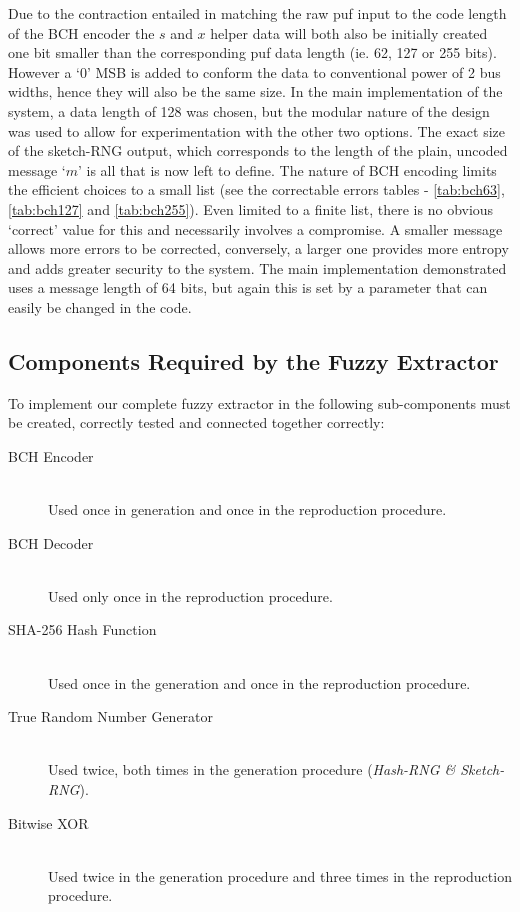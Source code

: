 Due to the contraction entailed in matching the raw \gls{puf} input to the
code length of the BCH encoder
the $s$ and $x$ helper data will both also be initially created one bit smaller
than the corresponding \gls{puf} data length (ie. 62, 127 or 255 bits).
However a `0' MSB
is added to conform the data to conventional power of 2 bus widths, hence
they will also be the same size. In the main implementation of the system, a data
length of 128 was chosen, but the modular nature of the design was used to
allow for experimentation with the other two options.
The exact size of the sketch-RNG output, which corresponds to the length of the
plain, uncoded message `$m$' is all that is now left to define. The nature
of BCH encoding limits the efficient choices to a small list (see the
correctable errors tables - \autoref{tab:bch63},
\autoref{tab:bch127} and \autoref{tab:bch255}).
Even limited to a finite list, there is no
obvious `correct' value for this and necessarily involves a compromise.
A smaller
message allows more errors to be corrected, conversely, a larger one provides more entropy and
adds greater security to the system. The main implementation demonstrated uses
a message length of 64 bits, but again this is set by a parameter that can easily be
changed in the code.

\subsection{Components Required by the Fuzzy Extractor}

To implement our complete fuzzy extractor in \matlab the following sub-components
must be created, correctly tested and connected together correctly:

\begin{description}
\item[BCH Encoder] \hfill \\
Used once in generation and once in the reproduction procedure.
\item[BCH Decoder] \hfill \\
Used only once in the reproduction procedure.
\item[SHA-256 Hash Function] \hfill \\
Used once in the generation and once in the reproduction procedure.
\item[True Random Number Generator] \hfill \\
Used twice, both times in the generation procedure
(\emph{Hash-RNG \& Sketch-RNG}).
\item[Bitwise XOR] \hfill \\
Used twice in the generation procedure and
three times in the reproduction procedure.
\end{description}

